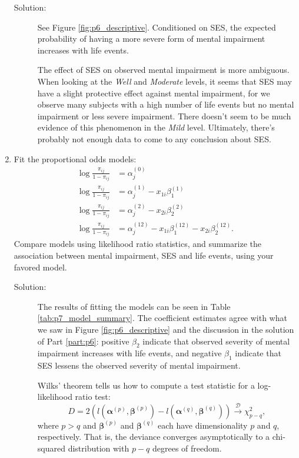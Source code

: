\documentclass[letterpaper,11pt]{article}
\begin{document}
\begin{enumerate}
  \begin{description}
  \item[Solution:] See Figure \ref{fig:p6_descriptive}. Conditioned on SES, the
    expected probability of having a more severe form of mental impairment
    increases with life events.

    The effect of SES on observed mental impairment is more ambiguous. When
    looking at the \emph{Well} and \emph{Moderate} levels, it seems that SES
    may have a slight protective effect against mental impairment, for we
    observe many subjects with a high number of life events but no mental
    impairment or less severe impairment. There doesn't seem to be much evidence
    of this phenomenon in the \emph{Mild} level. Ultimately, there's probably
    not enough data to come to any conclusion about SES.
  \end{description}
\item \label{part:p7} Fit the proportional odds models:
  \begin{align}
    \log\frac{\pi_{ij}}{1 - \pi_{ij}}
    &= \alpha_j^{(0)}
      \label{eqn:p7_model_1} \\
    \log\frac{\pi_{ij}}{1 - \pi_{ij}}
    &= \alpha_j^{(1)} - x_{1i}\beta_1^{(1)}
      \label{eqn:p7_model_2} \\
    \log\frac{\pi_{ij}}{1 - \pi_{ij}}
    &=  \alpha_j^{(2)} - x_{2i}\beta_2^{(2)}
      \label{eqn:p7_model_3} \\
    \log\frac{\pi_{ij}}{1 - \pi_{ij}}
    &= \alpha_j^{(12)} - x_{1i}\beta_1^{(12)} - x_{2i}\beta_2^{(12)}.
      \label{eqn:p7_model_4}
  \end{align}
  Compare models using likelihood ratio statistics, and summarize the
  association between mental impairment, SES and life events, using your favored
  model.

  
  
  \begin{description}
  \item[Solution:] The results of fitting the models can be seen in Table
    \ref{tab:p7_model_summary}. The coefficient estimates agree with what we saw
    in Figure \ref{fig:p6_descriptive} and the discussion in the solution of
    Part \ref{part:p6}: positive $\beta_2$ indicate that observed severity of
    mental impairment increases with life events, and negative $\beta_1$
    indicate that SES lessens the observed severity of mental impairment.

    Wilks' theorem tells us how to compute a test statistic for a log-likelihood
    ratio test:
    \begin{equation}
      D = 2\left(
        l\left(\bm\alpha^{(p)}, \bm\beta^{(p)}\right) -
        l\left(\bm\alpha^{(q)}, \bm\beta^{(q)}\right)        
      \right) \xrightarrow{\mathcal{D}} \chi^2_{p - q},
      \label{eqn:p7_deviance}
    \end{equation}
    where $p > q$ and $\bm\beta^{(p)}$ and $\bm\beta^{(q)}$ each have
    dimensionality $p$ and $q$, respectively. That is, the deviance converges
    asymptotically to a chi-squared distribution with $p-q$ degrees of freedom.


\end{description}
\end{enumerate}
\end{document}
